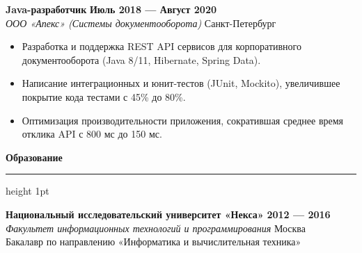 \documentclass[10pt,a4paper]{article}
\newcommand{\cvsection}[1]{%
  \vspace{12pt}%
  {\color{accentcolor}\large\bfseries #1}%
  \vspace{3pt}%
  {\color{dividercolor}\hrule height 1pt}%
  \vspace{6pt}%
}
\begin{document}
\begin{minipage}[t]{0.68\textwidth}
  \vspace{10pt}

  \textbf{Java-разработчик} \hfill \textbf{Июль 2018 — Август 2020} \\
  \textit{ООО «Апекс» (Системы документооборота)} \hfill \textcolor{graycolor}{Санкт-Петербург}
  \begin{itemize}[leftmargin=12pt,itemsep=3pt,topsep=3pt]
    \item Разработка и поддержка REST API сервисов для корпоративного документооборота (Java 8/11, Hibernate, Spring Data).
    \item Написание интеграционных и юнит-тестов (JUnit, Mockito), увеличившее покрытие кода тестами с 45\% до 80\%.
    \item Оптимизация производительности приложения, сократившая среднее время отклика API с 800 мс до 150 мс.
  \end{itemize}

  \cvsection{Образование}

  \textbf{Национальный исследовательский университет «Некса»} \hfill \textbf{2012 — 2016} \\
  \textit{Факультет информационных технологий и программирования} \hfill \textcolor{graycolor}{Москва} \\
  Бакалавр по направлению «Информатика и вычислительная техника»
\end{minipage}
\end{document}
